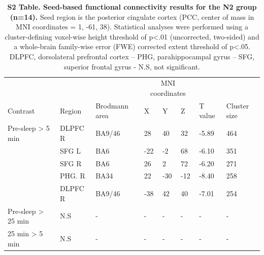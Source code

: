 \begin{table}[htbp]
    \caption*{\textbf{S2 Table. Seed-based functional connectivity results for the N2 group (n=14).} Seed region is the posterior cingulate cortex (PCC, center of mass in MNI coordinates = 1, -61, 38). Statistical analyses were performed using a cluster-defining voxel-wise height threshold of p<.01 (uncorrected, two-sided) and a whole-brain family-wise error (FWE) corrected extent threshold of p<.05. DLPFC, dorsolateral prefrontal cortex – PHG, parahippocampal gyrus – SFG, superior frontal gyrus - N.S, not significant.}
    \begin{tabularx}{\textwidth}{lXXllllX}
    \toprule
    &                       &                       & \multicolumn{3}{c}{MNI coordinates}                &              &               \\
    Contrast                & Region          		& Brodmann area & X          & Y         & Z         & T value 		& Cluster size  \\ \midrule
    Pre-sleep > 5 min       & DLPFC R               & BA9/46        & 28         & 40        & 32        & -5.89        & 464           \\
                            & SFG L                 & BA6           & -22        & -2        & 68        & -6.10        & 351           \\
                            & SFG R                 & BA6           & 26         & 2         & 72        & -6.20        & 271           \\
                            & PHG. R    			& BA34          & 22         & -30       & -12       & -8.40        & 258           \\
                            & DLPFC R               & BA9/46        & -38        & 42        & 40        & -7.01        & 254           \\
    Pre-sleep > 25 min      & N.S    				& -             & -          & -         & -         & -            & -             \\
    25 min > 5 min          & N.S    				& -             & -          & -         & -         & -            & -             \\ \bottomrule
    \end{tabularx}%
\end{table}

